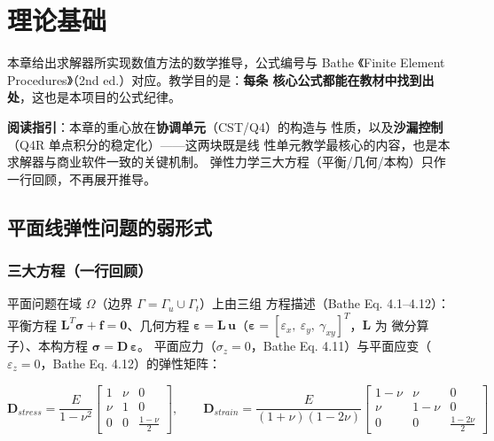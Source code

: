 \documentclass[12pt,a4paper]{ctexart}
\begin{document}
\section{理论基础}

本章给出求解器所实现数值方法的数学推导，公式编号与 Bathe
《Finite Element Procedures》（2nd ed.）对应。教学目的是：\textbf{每条
核心公式都能在教材中找到出处}，这也是本项目的公式纪律。

\textbf{阅读指引}：本章的重心放在\textbf{协调单元}（CST/Q4）的构造与
性质，以及\textbf{沙漏控制}（Q4R 单点积分的稳定化）——这两块既是线
性单元教学最核心的内容，也是本求解器与商业软件一致的关键机制。
弹性力学三大方程（平衡/几何/本构）只作一行回顾，不再展开推导。

\subsection{平面线弹性问题的弱形式}

\subsubsection{三大方程（一行回顾）}

平面问题在域 $\Omega$（边界 $\Gamma = \Gamma_u \cup \Gamma_t$）上由三组
方程描述（Bathe Eq. 4.1--4.12）：平衡方程 $\mathbf{L}^T\boldsymbol{\sigma}
+ \mathbf{f} = \mathbf{0}$、几何方程 $\boldsymbol{\varepsilon} =
\mathbf{L}\,\mathbf{u}$（$\boldsymbol{\varepsilon} =
[\varepsilon_x,\ \varepsilon_y,\ \gamma_{xy}]^T$，$\mathbf{L}$ 为
微分算子）、本构方程 $\boldsymbol{\sigma} = \mathbf{D}\,\boldsymbol{\varepsilon}$。
平面应力（$\sigma_z = 0$，Bathe Eq. 4.11）与平面应变（$\varepsilon_z =
0$，Bathe Eq. 4.12）的弹性矩阵：

\begin{equation}
\mathbf{D}_{stress} = \frac{E}{1-\nu^2}
\begin{bmatrix} 1 & \nu & 0 \\ \nu & 1 & 0 \\ 0 & 0 & \frac{1-\nu}{2} \end{bmatrix},
\qquad
\mathbf{D}_{strain} = \frac{E}{(1+\nu)(1-2\nu)}
\begin{bmatrix} 1-\nu & \nu & 0 \\ \nu & 1-\nu & 0 \\ 0 & 0 & \frac{1-2\nu}{2} \end{bmatrix}
\label{eq:constitutive}
\end{equation}
\end{document}
